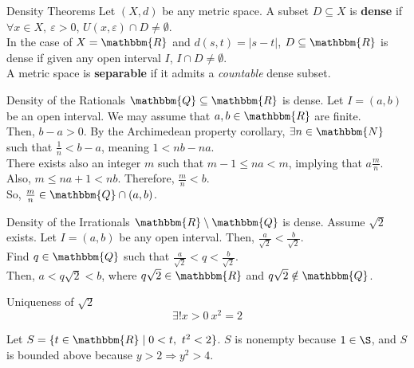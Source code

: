 \documentclass[10pt]{extarticle}
\newcommand{\N}{\mathbbm{N}}
\newcommand{\Q}{\mathbbm{Q}}
\newcommand{\R}{\mathbbm{R}}
\begin{document}
  \begin{problem}{Density Theorems}
    Let $(X,d)$ be any metric space. A subset $D\subseteq X$ is \textbf{dense} if $\forall x\in X,~ \varepsilon > 0$, $U(x,\varepsilon) \cap D \neq \emptyset$.\\

    In the case of $X = \R$ and $d(s,t) = |s-t|$, $D\subseteq \R$ is dense if given any open interval $I$, $I\cap D \neq \emptyset$.\\

    A metric space is \textbf{separable} if it admits a \textsl{countable} dense subset.
    \begin{problem}{Density of the Rationals}
      $\Q\subseteq\R$ is dense.
      \tcblower
      Let $I = (a,b)$ be an open interval. We may assume that $a,b\in\R$ are finite.\\

      Then, $b-a > 0$. By the Archimedean property corollary, $\exists n\in\N$ such that $\frac{1}{n} < b-a$, meaning $1 < nb-na$.\\

      There exists also an integer $m$ such that $m-1 \leq na < m$, implying that $a \frac{m}{n}$. Also, $m \leq na+1 < nb$. Therefore, $\frac{m}{n} < b$.\\

      So, $\frac{m}{n}\in \Q\cap (a,b)$.
    \end{problem}
    \begin{problem}{Density of the Irrationals}
      $\R\setminus\Q$ is dense.
      \tcblower
      Assume $\sqrt{2}$ exists. Let $I = (a,b)$ be any open interval. Then, $\frac{a}{\sqrt{2}} < \frac{b}{\sqrt{2}}$.\\

      Find $q\in\Q$ such that $\frac{a}{\sqrt{2}} < q < \frac{b}{\sqrt{2}}$.\\

      Then, $a < q\sqrt{2} < b$, where $q\sqrt{2} \in\R$ and $q\sqrt{2}\notin\Q$.
    \end{problem}
    \begin{problem}{Uniqueness of $\sqrt{2}$}
      \[
        \exists! x>0~x^2 = 2
      \] 
      \tcblower
      \begin{description}[font=\normalfont]
        \item[Existence:] Let $S = \{t\in\R \mid 0 <t,~t^2<2\}$. $S$ is nonempty because $1\in\S$, and $S$ is bounded above because $y > 2 \Rightarrow y^2 > 4$.\\


\end{description}
\end{problem}
\end{problem}
\end{document}
